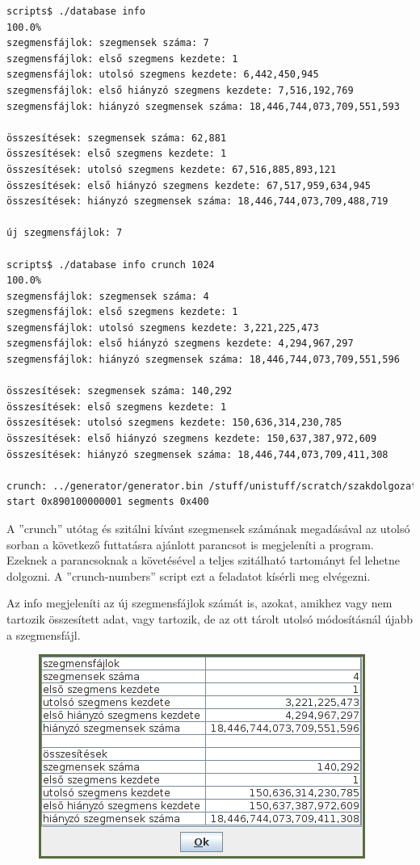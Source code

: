 \begin{lstlisting}[language=bash]
scripts$ ./database info
100.0%
szegmensfájlok: szegmensek száma: 7
szegmensfájlok: első szegmens kezdete: 1
szegmensfájlok: utolsó szegmens kezdete: 6,442,450,945
szegmensfájlok: első hiányzó szegmens kezdete: 7,516,192,769
szegmensfájlok: hiányzó szegmensek száma: 18,446,744,073,709,551,593

összesítések: szegmensek száma: 62,881
összesítések: első szegmens kezdete: 1
összesítések: utolsó szegmens kezdete: 67,516,885,893,121
összesítések: első hiányzó szegmens kezdete: 67,517,959,634,945
összesítések: hiányzó szegmensek száma: 18,446,744,073,709,488,719

új szegmensfájlok: 7

scripts$ ./database info crunch 1024
100.0%                     
szegmensfájlok: szegmensek száma: 4
szegmensfájlok: első szegmens kezdete: 1
szegmensfájlok: utolsó szegmens kezdete: 3,221,225,473
szegmensfájlok: első hiányzó szegmens kezdete: 4,294,967,297
szegmensfájlok: hiányzó szegmensek száma: 18,446,744,073,709,551,596

összesítések: szegmensek száma: 140,292
összesítések: első szegmens kezdete: 1
összesítések: utolsó szegmens kezdete: 150,636,314,230,785
összesítések: első hiányzó szegmens kezdete: 150,637,387,972,609
összesítések: hiányzó szegmensek száma: 18,446,744,073,709,411,308

crunch: ../generator/generator.bin /stuff/unistuff/scratch/szakdolgozat/db
start 0x890100000001 segments 0x400
\end{lstlisting}

A ''crunch'' utótag és szitálni kívánt szegmensek számának megadásával az utolsó sorban
a következő futtatásra ajánlott parancsot is megjeleníti a program.
Ezeknek a parancsoknak a követésével a teljes szitálható tartományt fel lehetne dolgozni.
A ''crunch-numbers'' script ezt a feladatot kísérli meg elvégezni.

Az info megjeleníti az új szegmensfájlok számát is, azokat,
amikhez vagy nem tartozik összesített adat, vagy tartozik,
de az ott tárolt utolsó módosításnál újabb a szegmensfájl.

\begin{figure}[h]
\centering
\includegraphics[scale=1]{info.png}
\end{figure}

